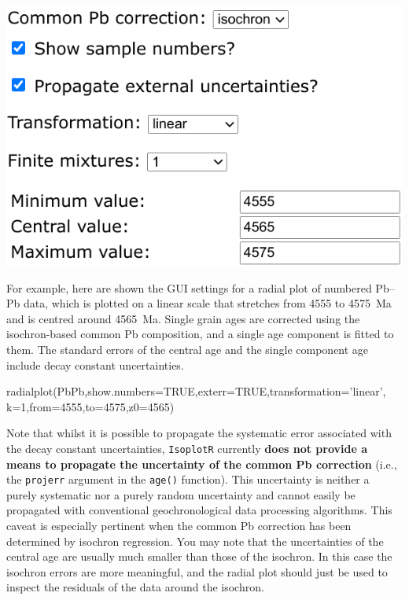 \begin{refsection}
\noindent\begin{minipage}[t]{.45\linewidth}
\strut\vspace*{-\baselineskip}\newline
\includegraphics[width=\linewidth]{../figures/PbPbRadialOptions.png}
\end{minipage}
\begin{minipage}[t]{.55\linewidth}
  For example, here are shown the GUI settings for a radial plot of
  numbered Pb--Pb data, which is plotted on a linear scale that
  stretches from 4555 to 4575~Ma and is centred around 4565~Ma. Single
  grain ages are corrected using the isochron-based common Pb
  composition, and a single age component is fitted to them. The
  standard errors of the central age and the single component age
  include decay constant uncertainties.
\end{minipage}

\begin{script}
radialplot(PbPb,show.numbers=TRUE,exterr=TRUE,transformation='linear',
           k=1,from=4555,to=4575,z0=4565)
\end{script}

Note that whilst it is possible to propagate the systematic error
associated with the decay constant uncertainties, \texttt{IsoplotR}
currently \textbf{does not provide a means to propagate the
  uncertainty of the common Pb correction} (i.e., the \texttt{projerr}
argument in the \texttt{age()} function). This uncertainty is neither
a purely systematic nor a purely random uncertainty and cannot easily
be propagated with conventional geochronological data processing
algorithms. This caveat is especially pertinent when the common Pb
correction has been determined by isochron regression. You may note
that the uncertainties of the central age are usually much smaller
than those of the isochron. In this case the isochron errors are more
meaningful, and the radial plot should just be used to inspect the
residuals of the data around the isochron.\\


\end{refsection}
